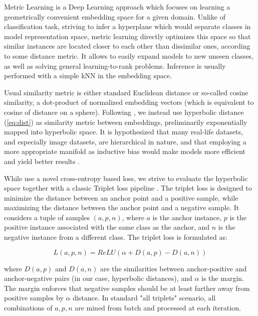 \documentclass[10pt, letterpaper, twocolumn]{article}
\begin{document}
Metric Learning is a Deep Learning approach which focuses on learning a geometrically convenient embedding space for a given domain. Unlike of classification task, striving to infer a hyperplane which would separate classes in model representation space, metric learning directly optimizes this space so that similar instances are located closer to each other than dissimilar ones, according to some distance metric. It allows to easily expand models to new unseen classes, as well as solving general learning-to-rank problems. Inference is usually performed with a simple kNN in the embedding space.

Usual similarity metric is either standard Euclidean distance or so-called cosine similarity, a dot-product of normalized embedding vectors (which is equivalent to cosine of distance on a sphere). Following \cite{ermolov_hyperbolic_2022}, we instead use hyperbolic distance (\ref{eq:dist}) as similarity metric between embeddings, preliminarily exponentially mapped into hyperbolic space. It is hypothesized that many real-life datasets, and especially image datasets, are hierarchical in nature, and that employing a more appropriate manifold as inductive bias would make models more efficient and yield better results \cite{khrulkov_hyperbolic_2020}.

While \cite{ermolov_hyperbolic_2022} use a novel cross-entropy based loss, we strive to evaluate the hyperbolic space together with a classic Triplet loss pipeline \cite{hermans_defense_2017}.
The triplet loss is designed to minimize the distance between an anchor point and a positive sample, while maximizing the distance between the anchor point and a negative sample. It considers a tuple of samples $(a,p,n)$, where $a$ is the anchor instance, $p$ is the positive instance associated with the same class as the anchor, and $n$ is the negative instance from a different class. The triplet loss is formulated as:

\begin{equation}
L(a, p, n) = ReLU(\alpha + D(a, p) - D(a, n))
\end{equation}

where $D(a, p)$ and $D(a, n)$ are the similarities between anchor-positive and anchor-negative pairs (in our case, hyperbolic distances), and $\alpha$ is the margin. The margin enforces that negative samples should be at least farther away from positive samples by $\alpha$ distance. In standard "all triplets" scenario, all combinations of $a, p, n$ are mined from batch and processed at each iteration.
\end{document}
